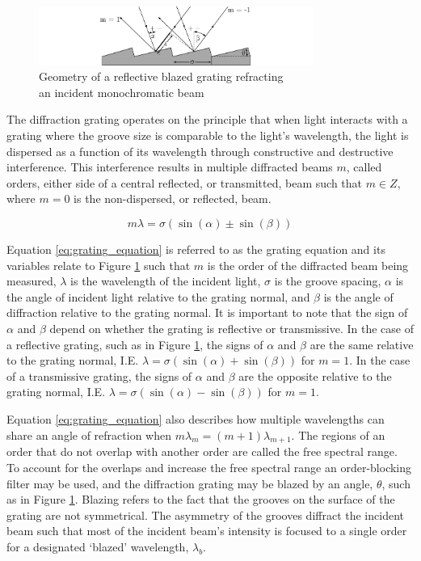 \begin{figure}[t]
    \centering
    \includegraphics[width = 9cm]{figures/2_grating_diagram.pdf}
    \caption{Geometry of a reflective blazed grating refracting\\an incident monochromatic beam}
    \label{fig:grating_diagram}
\end{figure}

The diffraction grating operates on the principle that when light interacts with a grating where the groove size is comparable to the light's wavelength, the light is dispersed as a function of its wavelength through constructive and destructive interference. This interference results in multiple diffracted beams $m$, called orders, either side of a central reflected, or transmitted, beam such that $m \in Z$, where $m = 0$ is the non-dispersed, or reflected, beam.

\begin{equation}
	m\lambda = \sigma (\sin(\alpha) \pm \sin(\beta))
    \label{eq:grating_equation}
\end{equation}

Equation \ref{eq:grating_equation} is referred to as the grating equation and its variables relate to Figure \ref{fig:grating_diagram} such that $m$ is the order of the diffracted beam being measured, $\lambda$ is the wavelength of the incident light, $\sigma$ is the groove spacing, $\alpha$ is the angle of incident light relative to the grating normal, and $\beta$ is the angle of diffraction relative to the grating normal. It is important to note that the sign of $\alpha$ and $\beta$ depend on whether the grating is reflective or transmissive. In the case of a reflective grating, such as in Figure \ref{fig:grating_diagram}, the signs of $\alpha$ and $\beta$ are the same relative to the grating normal, I.E. $\lambda = \sigma (\sin(\alpha) + \sin(\beta))$ for $m = 1$. In the case of a transmissive grating, the signs of $\alpha$ and $\beta$ are the opposite relative to the grating normal, I.E. $\lambda = \sigma (\sin(\alpha) - \sin(\beta))$ for $m = 1$.
\prgph

Equation \ref{eq:grating_equation} also describes how multiple wavelengths can share an angle of refraction when $m\lambda_{m} = (m + 1)\lambda_{m + 1}$. The regions of an order that do not overlap with another order are called the free spectral range. To account for the overlaps and increase the free spectral range an order-blocking filter may be used, and the diffraction grating may be blazed by an angle, $\theta$, such as in Figure \ref{fig:grating_diagram}. Blazing refers to the fact that the grooves on the surface of the grating are not symmetrical. The asymmetry of the grooves diffract the incident beam such that most of the incident beam's intensity is focused to a single order for a designated `blazed' wavelength, $\lambda_{b}$.

